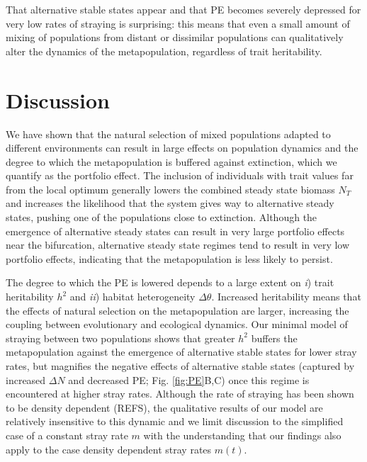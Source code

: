 \documentclass[twocolumn,preprintnumbers,amsmath,amssymb,superscriptaddress]{revtex4}
\begin{document}
That alternative stable states appear and that PE becomes severely depressed for very low rates of straying is surprising: this means that even a small amount of mixing of populations from distant or dissimilar populations can qualitatively alter the dynamics of the metapopulation, regardless of trait heritability.


\section*{Discussion}

We have shown that the natural selection of mixed populations adapted to different environments can result in large effects on population dynamics and the degree to which the metapopulation is buffered against extinction, which we quantify as the portfolio effect.
The inclusion of individuals with trait values far from the local optimum generally lowers the combined steady state biomass $N_T$ and increases the likelihood that the system gives way to alternative steady states, pushing one of the populations close to extinction.
Although the emergence of alternative steady states can result in very large portfolio effects near the bifurcation, alternative steady state regimes tend to result in very low portfolio effects, indicating that the metapopulation is less likely to persist.

The degree to which the PE is lowered depends to a large extent on \emph{i}) trait heritability $h^2$ and \emph{ii}) habitat heterogeneity $\Delta \theta$.
Increased heritability means that the effects of natural selection on the metapopulation are larger, increasing the coupling between evolutionary and ecological dynamics. 
Our minimal model of straying between two populations shows that greater $h^2$ buffers the metapopulation against the emergence of alternative stable states for lower stray rates, but magnifies the negative effects of alternative stable states (captured by increased $\Delta N$ and decreased PE; Fig. \ref{fig:PE}B,C) once this regime is encountered at higher stray rates.
Although the rate of straying has been shown to be density dependent (REFS), the qualitative results of our model are relatively insensitive to this dynamic and we limit discussion to the simplified case of a constant stray rate $m$ with the understanding that our findings also apply to the case density dependent stray rates $m(t)$.
\end{document}

